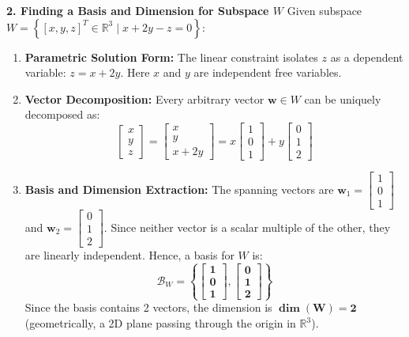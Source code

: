 \textbf{2. Finding a Basis and Dimension for Subspace $W$}
Given subspace $W = \left\{ [x, y, z]^T \in \mathbb{R}^3 \mid x + 2y - z = 0 \right\}$:
\begin{enumerate}
    \item \textbf{Parametric Solution Form:}
    The linear constraint isolates $z$ as a dependent variable: $z = x + 2y$. Here $x$ and $y$ are independent free variables.
    \item \textbf{Vector Decomposition:}
    Every arbitrary vector $\mathbf{w} \in W$ can be uniquely decomposed as:
    \begin{equation*}
    \begin{bmatrix} x \\ y \\ z \end{bmatrix} = \begin{bmatrix} x \\ y \\ x + 2y \end{bmatrix} = x \begin{bmatrix} 1 \\ 0 \\ 1 \end{bmatrix} + y \begin{bmatrix} 0 \\ 1 \\ 2 \end{bmatrix}
    \end{equation*}
    \item \textbf{Basis and Dimension Extraction:}
    The spanning vectors are $\mathbf{w}_1 = \begin{bmatrix} 1 \\ 0 \\ 1 \end{bmatrix}$ and $\mathbf{w}_2 = \begin{bmatrix} 0 \\ 1 \\ 2 \end{bmatrix}$. Since neither vector is a scalar multiple of the other, they are linearly independent.
    Hence, a basis for $W$ is:
    \begin{equation*}
    \mathcal{B}_W = \mathbf{\left\{ \begin{bmatrix} 1 \\ 0 \\ 1 \end{bmatrix}, \begin{bmatrix} 0 \\ 1 \\ 2 \end{bmatrix} \right\}}
    \end{equation*}
    Since the basis contains 2 vectors, the dimension is $\mathbf{\dim(W) = 2}$ (geometrically, a 2D plane passing through the origin in $\mathbb{R}^3$).
\end{enumerate}

